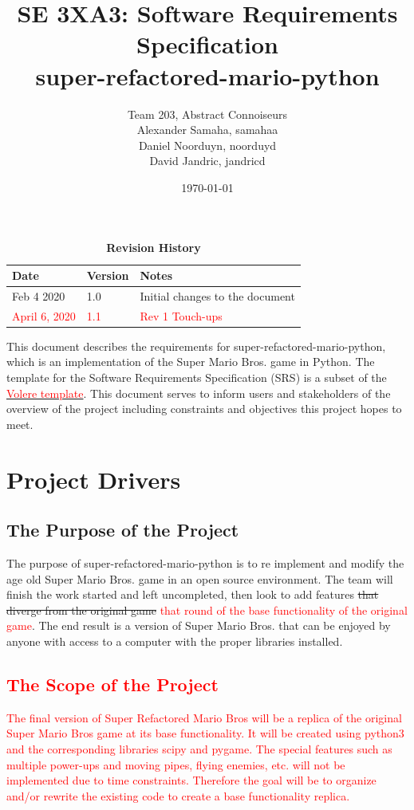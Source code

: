 \documentclass[12pt, titlepage]{article}
\title{SE 3XA3: Software Requirements Specification\\super-refactored-mario-python}
\author{Team 203, Abstract Connoiseurs
		\\ Alexander Samaha, samahaa
		\\ Daniel Noorduyn, noorduyd
		\\ David Jandric, jandricd
}
\date{\today}
\begin{document}
\maketitle

\tableofcontents
\listoftables
\listoffigures

\begin{table}[bp]
\caption{\bf Revision History}
\begin{tabularx}{\textwidth}{p{3cm}p{2cm}X}
\toprule {\bf Date} & {\bf Version} & {\bf Notes}\\
\midrule
Feb 4 2020 & 1.0 & Initial changes to the document \\
\textcolor{red}{April 6, 2020} & \textcolor{red}{1.1} & \textcolor{red}{Rev 1 Touch-ups}\\
\bottomrule
\end{tabularx}
\end{table}

\newpage


This document describes the requirements for super-refactored-mario-python,
which is an implementation of the Super Mario Bros. game in Python. The template
for the Software Requirements Specification (SRS) is a subset of the
\href{RobertsonAndRobertson2012}{\textcolor{red}{Volere template}}. This
document serves to inform users and stakeholders of the overview of the project
including constraints and objectives this project hopes to meet.

\section{Project Drivers}

\subsection{The Purpose of the Project}
    The purpose of super-refactored-mario-python is to re implement and modify the age old Super Mario Bros. game in an open source environment. The team will finish the work started and left uncompleted, then look to add features \sout{that diverge from the original game} \textcolor{red}{that round of the base functionality of the original game}. The end result is a version of Super Mario Bros. that can be enjoyed by anyone with access to a computer with the proper libraries installed.

\subsection{\textcolor{red}{The Scope of the Project}}
    \textcolor{red}{The final version of Super Refactored Mario Bros will be a replica of the original Super Mario Bros game at its base functionality. It will be created using python3 and the corresponding libraries scipy and pygame. The special features such as multiple power-ups and moving pipes, flying enemies, etc. will not be implemented due to time constraints. Therefore the goal will be to organize and/or rewrite the existing code to create a base functionality replica.}
\end{document}
